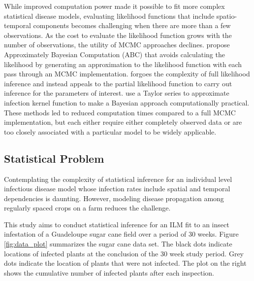 \documentclass{uwstat572}
\begin{document}
While improved computation power made it possible to fit more complex statistical disease models, evaluating likelihood functions that include spatio-temporal components becomes challenging when there are more than a few observations. 
As the cost to evaluate the likelihood function grows with the number of observations, the utility of MCMC approaches declines.
\citet{McKinley} propose Approximately Bayesian Computation (ABC) that avoids calculating the likelihood by generating an approximation to the likelihood function with each pass through an MCMC implementation. 
\citet{Diggle} forgoes the complexity of full likelihood inference and instead appeals to the partial likelihood function to carry out inference for the parameters of interest. 
\citet{Deardon} use a Taylor series to approximate infection kernel function to make a Bayesian approach computationally practical. 
These methods led to reduced computation times compared to a full MCMC implementation, but each either require either completely observed data or are too closely associated with a particular model to be widely applicable.

\subsection{Statistical Problem}
Contemplating the complexity of statistical inference for an individual level infectious disease model whose infection rates include spatial and temporal dependencies is daunting.
However, modeling disease propagation among regularly spaced crops on a farm reduces the challenge. 

This study aims to conduct statistical inference for an ILM fit to an insect infestation of a Guadeloupe sugar cane field over a period of 30 weeks.
Figure \ref{fig:data_plot} summarizes the sugar cane data set. 
The black dots indicate locations of infected plants at the conclusion of the 30 week study period. 
Grey dots indicate the location of plants that were not infected. 
The plot on the right shows the cumulative number of infected plants after each inspection.
\end{document}
